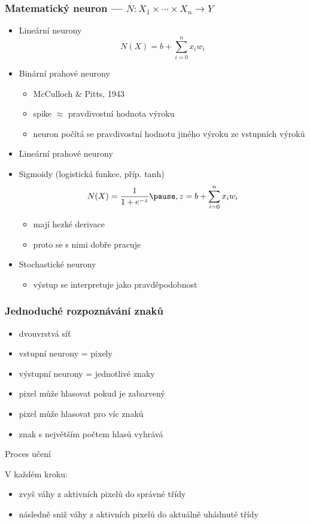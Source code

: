 \documentclass[red,professionalfont]{beamer}
\theoremstyle{definition}
\newcommand{\0}{\mbox{${\bf 0}$}}
\begin{document}
\begin{frame}\frametitle{Matematický neuron --- $N: X_1\times\cdots\times X_n\to Y$}
\pause
 \begin{itemize}
  \item Lineární neurony
  \begin{displaymath}
   N(X) = b + \sum_{i=0}^n x_i w_i
  \end{displaymath}\pause
  \item Binární prahové neurony\pause
  \begin{itemize}
    \item McCulloch \& Pitts, 1943\pause
    \item spike $\approx$ pravdivostní hodnota výroku\pause
    \item neuron počítá se pravdivostní hodnotu jiného výroku ze vstupních výroků\pause
  \end{itemize}
  \item Lineární prahové neurony\pause
  \item Sigmoidy (logistická funkce, příp. tanh)\pause
  \begin{displaymath}
   N(X) = \frac{1}{1 + e^{-z}}\pause, z = b + \sum_{i=0}^n x_i w_i
  \end{displaymath}\pause
  \begin{itemize}
    \item mají hezké derivace\pause
    \item proto se s nimi dobře pracuje\pause
  \end{itemize}
  \item Stochastické neurony\pause
    \begin{itemize}
    \item výstup se interpretuje jako pravděpodobnost
    \end{itemize}
 \end{itemize}
\end{frame}

\begin{frame}\frametitle{Jednoduché rozpoznávání znaků}
\begin{itemize}
 \item dvouvrstvá síť\pause
 \item vstupní neurony = pixely\pause
 \item výstupní neurony = jednotlivé znaky\pause
 \item pixel může hlasovat pokud je zabarvený\pause
 \item pixel může hlasovat pro víc znaků\pause
 \item znak s největším počtem hlasů vyhrává\pause
\end{itemize}

\begin{center}
 Proces učení
\end{center}\pause
 V každém kroku:\pause
 \begin{itemize}
  \item zvyš váhy z aktivních pixelů do správné třídy\pause
  \item následně sniž váhy z aktivních pixelů do aktuálně uhádnuté třídy
 \end{itemize}
\end{frame}
\end{document}
